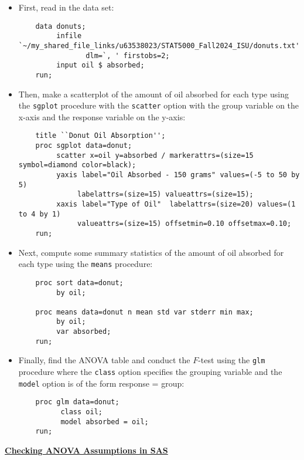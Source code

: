 \documentclass[11pt]{article}
\begin{document}
\begin{itemize}
	\item First, read in the data set:
	\begin{verbatim}
	data donuts;
	     infile `~/my_shared_file_links/u63538023/STAT5000_Fall2024_ISU/donuts.txt' 
	            dlm=`, ' firstobs=2;
	     input oil $ absorbed;
	run;
	\end{verbatim}
	\item Then, make a scatterplot of the amount of oil absorbed for each type using the \texttt{sgplot} procedure with the \texttt{scatter} option with the group variable on the x-axis and the response variable on the y-axis:
	\begin{verbatim}
	title ``Donut Oil Absorption'';
	proc sgplot data=donut;
	     scatter x=oil y=absorbed / markerattrs=(size=15 symbol=diamond color=black);
	     yaxis label="Oil Absorbed - 150 grams" values=(-5 to 50 by 5) 
	          labelattrs=(size=15) valueattrs=(size=15);
	     xaxis label="Type of Oil"  labelattrs=(size=20) values=(1 to 4 by 1)  
	          valueattrs=(size=15) offsetmin=0.10 offsetmax=0.10;
	run;
	\end{verbatim}
	\item Next, compute some summary statistics of the amount of oil absorbed for each type using the \texttt{means} procedure:
	\begin{verbatim}
	proc sort data=donut; 
	     by oil;
	
	proc means data=donut n mean std var stderr min max;
	     by oil;
	     var absorbed;
	run;
	\end{verbatim}
	\item Finally, find the ANOVA table and conduct the $F$-test using the \texttt{glm} procedure where the \texttt{class} option specifies the grouping variable and the \texttt{model} option is of the form response = group:
	\begin{verbatim}
	proc glm data=donut;
	      class oil;
	      model absorbed = oil;
	run;
	\end{verbatim}
\end{itemize}
\vfill

\textbf{\underline{Checking ANOVA Assumptions in SAS}}
\end{document}
